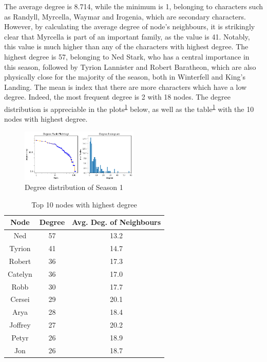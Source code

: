 \documentclass[10pt,twocolumn,letterpaper]{article}
\begin{document}
The average degree is 8.714, while the minimum is 1, belonging to characters such as Randyll, Myrcella, Waymar and Irogenia, which are secondary characters. However, by calculating the average degree of node's neighbours, it is strikingly clear that Myrcella is part of an important family, as the value is 41. Notably, this value is much higher than any of the characters with highest degree. 
The highest degree is 57, belonging to Ned Stark, who has a central importance in this season, followed by Tyrion Lannister and Robert Baratheon, which are also physically close for the majority of the season, both in Winterfell and King's Landing. The mean is index that there are more characters which have a low degree. Indeed, the most frequent degree is 2 with 18 nodes. The degree distribution is appreciable in the plots\textsuperscript{\ref{fig:degplot_s1}} below, as well as the table\textsuperscript{\ref{tab:deg_s1}} with the 10 nodes with highest degree.

\begin{figure}[!h]
    \centering
    \includegraphics[width=0.5\textwidth]{img/s1/degree_plot.jpg}
    \caption{\small{Degree distribution of Season 1}}
    \label{fig:degplot_s1}
\end{figure}

\begin{table}[!h]
    \centering
    \small
    \begin{tabular}{c|c|c}
        Node & Degree & \small{Avg. Deg. of Neighbours}  \\
        \hline
         Ned  &  57 & 13.2 \\
         Tyrion & 41 & 14.7 \\
        Robert & 36 & 17.3 \\
        Catelyn  & 36 & 17.0 \\
        Robb  & 30 & 17.7 \\
        Cersei  & 29 & 20.1 \\
        Arya  & 28 & 18.4 \\
        Joffrey  & 27 & 20.2 \\
        Petyr  & 26 & 18.9 \\
        Jon  & 26 & 18.7 \\
        \hline 
    \end{tabular} \\
    \caption{Top 10 nodes with highest degree}
    \label{tab:deg_s1}
\end{table}
\end{document}
